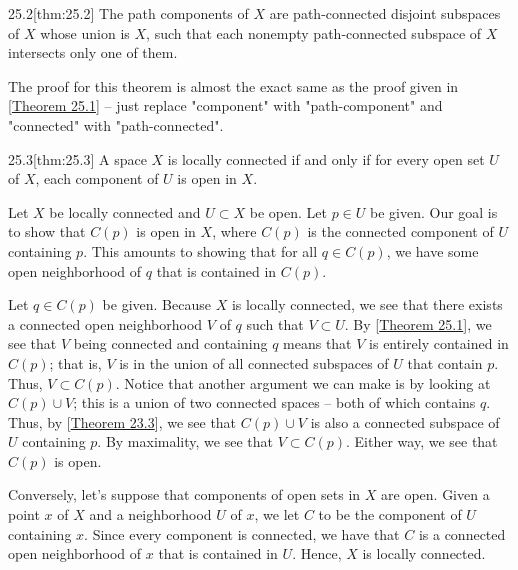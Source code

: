 \begin{thmBox}{25.2}[thm:25.2]
    The path components of \( X \) are path-connected disjoint subspaces of
    \( X \) whose union is \( X \), such that each nonempty path-connected
    subspace of \( X \) intersects only one of them.

    \baseRule

    \begin{proofBox}
        The proof for this theorem is almost the exact same as the proof given
        in [\hyperlink{thm:25.1}{Theorem 25.1}] -- just replace "component" with
        "path-component" and "connected" with "path-connected".
    \end{proofBox}
\end{thmBox}

\begin{thmBox}{25.3}[thm:25.3]
    A space \( X \) is locally connected if and only if for every open set 
    \( U \) of \( X \), each component of \( U \) is open in \( X \).

    \baseRule

    \begin{proofBox}
        Let \( X \) be locally connected and \( U \subset X \) be open.
        Let \( p \in U \) be given.
        Our goal is to show that \( C ( p ) \) is open in \( X \), where
        \( C ( p ) \) is the connected component of \( U \) containing \( p \).
        This amounts to showing that for all \( q \in C ( p ) \), we have 
        some open neighborhood of \( q \) that is contained in \( C ( p ) \).

        \baseSkip 

        Let \( q \in C ( p ) \) be given.
        Because \( X \) is locally connected, we see that there exists a 
        connected open neighborhood \( V \) of \( q \) such that 
        \( V \subset U \).
        By [\hyperlink{thm:25.1}{Theorem 25.1}], we see that \( V \) being 
        connected and containing \( q \) means that \( V \) is entirely
        contained in \( C ( p ) \); that is, \( V \) is in the union of all 
        connected subspaces of \( U \) that contain \( p \).
        Thus, \( V \subset C ( p ) \).
        Notice that another argument we can make is by looking at 
        \( C ( p ) \cup V \); this is a union of two connected spaces -- 
        both of which contains \( q \).
        Thus, by [\hyperlink{thm:23.3}{Theorem 23.3}], we see that 
        \( C ( p ) \cup V \) is also a connected subspace of \( U \) containing
        \( p \).
        By maximality, we see that \( V \subset C ( p ) \).
        Either way, we see that \( C ( p ) \) is open.

        \baseSkip

        Conversely, let's suppose that components of open sets in \( X \) are 
        open.
        Given a point \( x \) of \( X \) and a neighborhood \( U \) of \( x \),
        we let \( C \) to be the component of \( U \) containing \( x \).
        Since every component is connected, we have that \( C \) is a connected
        open neighborhood of \( x \) that is contained in \( U \).
        Hence, \( X \) is locally connected.
    \end{proofBox}
\end{thmBox}

